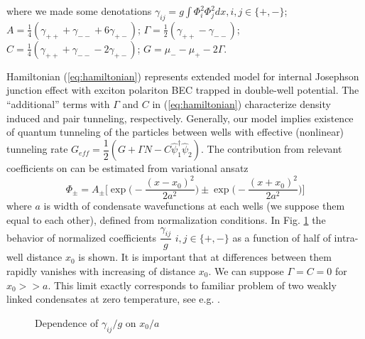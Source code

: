 \documentclass[aps, pre, preprint, groupedaddress, superscriptaddress, showkeys, showpacs] {revtex4-1}
\begin{document}
%
where we made some denotations $\gamma_{ij} = g \int \Phi_i^2 \Phi_j^2 dx, i,j \in \{+,-\}$;
$A = \frac{1}{4} (\gamma_{++} + \gamma_{--} + 6 \gamma_{+-})$; $\Gamma = \frac{1}{2} (\gamma_{++} - \gamma_{--})$; $C = \frac{1}{4} (\gamma_{++} + \gamma_{--} - 2\gamma_{+-})$; $G = \mu_- - \mu_+ - 2\Gamma$.

Hamiltonian (\ref{eq:hamiltonian}) represents extended model for internal Josephson junction effect with exciton polariton BEC trapped in double-well potential.
The ``additional'' terms with $\Gamma$ and $C$ in (\ref{eq:hamiltonian}) characterize density induced and pair tunneling, respectively.
Generally, our model implies existence of quantum tunneling of the particles between wells with effective (nonlinear) tunneling rate $G_{eff} = \dfrac{1}{2}(G+\Gamma N - C\hat{\psi}_1^\dag\hat{\psi}_2)$.
The contribution from relevant coefficients on can be estimated from variational ansatz
%
\begin{equation}
\Phi_{\pm} = A_{\pm} \Big[ \exp \Big( -\dfrac{(x - x_0)^2}{2 a^2} \Big) \pm \exp \Big( -\dfrac{(x + x_0)^2}{2 a^2} \Big) \Big]
\label{eq:two_modes_eq}
\end{equation}
%
where $a$ is width of condensate wavefunctions at each wells (we suppose them equal to each other), defined from normalization conditions.
In Fig. \ref{pic:gamma_pm_vs_g} the behavior of normalized coefficients $\dfrac{\gamma_{ij}}{g}$ $i,j \in \{+,-\}$ as a function of half of intra-well distance $x_0$ is shown.
It is important that at differences between them rapidly vanishes with increasing of distance $x_0$.
We can suppose $\Gamma = C = 0$ for $x_0 >> a$.
This limit exactly corresponds to familiar problem of two weakly linked condensates at zero temperature, see e.g. \cite{Aleiner, Shelykh_2008, Borgh_2010, Raghavan}.
%
\begin{figure}[ht]
\caption{Dependence of $\gamma_{ij} / g$ on $x_0 / a$ \label{pic:gamma_pm_vs_g}}
\end{figure}
%
\end{document}
